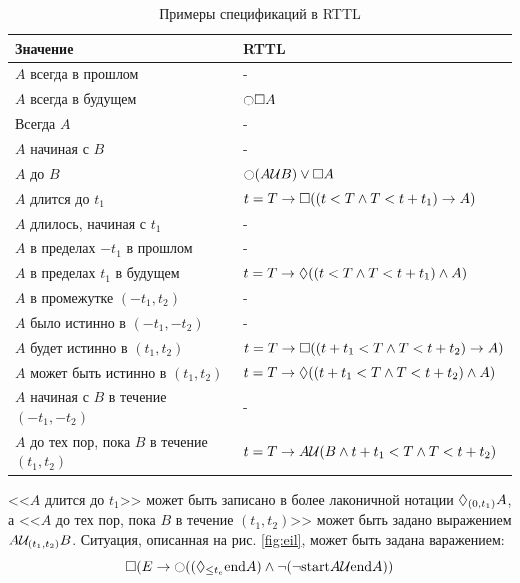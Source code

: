 		\begin{table} [htbp]
			\centering
			\caption{Примеры спецификаций в RTTL}
			\label{table:rttl}%
		\begin{tabular}{|l|l|}
			\hline 
			Значение & RTTL \\
			\hline 
			\hline 
			$ A $ всегда в прошлом & - \\ 
			$ A $ всегда в будущем & $ \Next \futureAlways A $ \\ 
			Всегда $ A $ & - \\
			$ A $ начиная с $ B $ & - \\ 
			$ A $ до $ B $ & $ \Next (A \untilShort B) \lor \futureAlways A $  \\ 
			\hline 
			$ A $ длится до $ t_1 $& $ t= T \rightarrow \square ((t < T \land T < t + t_1) \rightarrow A) $ \\ 
			$ A $ длилось, начиная с $ t_1 $ & -  \\ 
			$ A $ в пределах $ -t_1 $ в прошлом & - \\ 
			$ A $ в пределах $ t_1 $ в будущем & $ t = T \rightarrow \lozenge ((t<T \land T<t+t_1) \land A) $  \\ 
			\hline 
			$ A $ в промежутке $ (-t_1, t_2) $& - \\ 
			$ A $ было истинно в $ (-t_1,-t_2) $&-  \\ 
			$ A $ будет истинно в $ (t_1,t_2) $& $ t = T \rightarrow \square((t+t_1<T\land T<t+t_2)\rightarrow A) $  \\
			$ A $ может быть истинно в $ (t_1,t_2) $& $ t = T \rightarrow \lozenge((t+t_1<T\land T<t+t_2)\land A) $  \\
			\hline
			$ A $ начиная с $ B $ в течение $ (-t_1, -t_2) $ & - \\  
			$ A $ до тех пор, пока $ B $ в течение $ (t_1,t_2) $ & $ t = T \rightarrow A \mathcal{U} (B\land t+t_1 < T \land T < t+t_2) $ \\ 
			\hline 
		\end{tabular} 
	\end{table}

		<<$ A $ длится до $ t_1 $>> может быть записано в более лаконичной нотации $ \lozenge_{(0,t_1)}A $, а <<$ A $ до тех пор, пока $ B $ в течение $ (t_1,t_2) $>> может быть задано выражением $ A\mathcal{U}_{(t_1,t_2)} B $. 
		Ситуация, описанная на рис. \ref{fig:eil}, может быть задана варажением: \[\futureAlways(E\rightarrow\Next((\futureEventually_{\leq t_e} \text{end} A) \land \neg (\neg \text{start} A \untilShort \text{end} A)) \]
		
